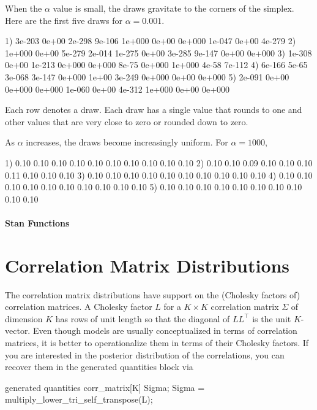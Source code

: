 When the $\alpha$ value is small, the draws gravitate to the corners
of the simplex.  Here are the first five draws for $\alpha = 0.001$.
%
\begin{stancode}
1) 3e-203 0e+00 2e-298 9e-106 1e+000 0e+00 0e+000 1e-047 0e+00 4e-279
2) 1e+000 0e+00 5e-279 2e-014 1e-275 0e+00 3e-285 9e-147 0e+00 0e+000
3) 1e-308 0e+00 1e-213 0e+000 0e+000 8e-75 0e+000 1e+000 4e-58 7e-112
4) 6e-166 5e-65 3e-068 3e-147 0e+000 1e+00 3e-249 0e+000 0e+00 0e+000
5) 2e-091 0e+00 0e+000 0e+000 1e-060 0e+00 4e-312 1e+000 0e+00 0e+000
\end{stancode}
%
Each row denotes a draw.  Each draw has a single value that rounds to
one and other values that are very close to zero or rounded down to
zero.

%
As $\alpha$ increases, the draws become increasingly uniform.  For $\alpha = 1000$,
%
\begin{stancode}
1) 0.10 0.10 0.10 0.10 0.10 0.10 0.10 0.10 0.10 0.10
2) 0.10 0.10 0.09 0.10 0.10 0.10 0.11 0.10 0.10 0.10
3) 0.10 0.10 0.10 0.10 0.10 0.10 0.10 0.10 0.10 0.10
4) 0.10 0.10 0.10 0.10 0.10 0.10 0.10 0.10 0.10 0.10
5) 0.10 0.10 0.10 0.10 0.10 0.10 0.10 0.10 0.10 0.10
\end{stancode}



\subsubsection{Stan Functions}

\begin{description}
\end{description}
%
\begin{description}
\end{description}


\chapter{Correlation Matrix Distributions}

\noindent
The correlation matrix distributions have support on the (Cholesky
factors of) correlation matrices.  A Cholesky factor $L$ for a $K
\times K$ correlation matrix $\Sigma$ of dimension $K$ has rows of unit
length so that the diagonal of $L L^{\top}$ is the unit $K$-vector. Even
though models are usually conceptualized in terms of correlation matrices,
it is better to operationalize them in terms of their Cholesky factors.
If you are interested in the posterior distribution of the correlations,
you can recover them in the generated quantities block via
%
\begin{stancode}
generated quantities {
  corr_matrix[K] Sigma;
  Sigma = multiply_lower_tri_self_transpose(L);
}
\end{stancode}
%
